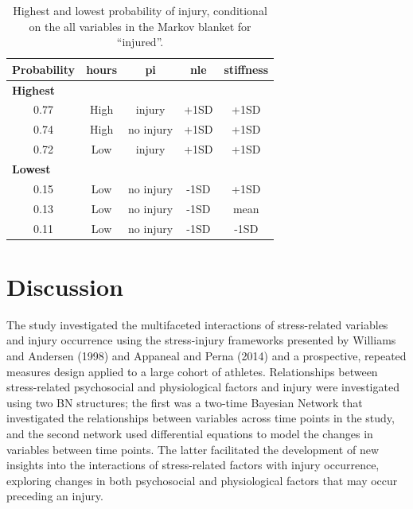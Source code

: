 \documentclass[
  english,
  man]{apa6}
\begin{document}
\begin{table}[H]

\caption{\label{tab:table10}Highest and lowest probability of injury, conditional on the all variables in the Markov blanket for ``injured''.}
\centering
\begin{tabular}[t]{c|c|c|c|c}
\hline
\textbf{Probability} & \textbf{hours} & \textbf{pi} & \textbf{nle} & \textbf{stiffness}\\
\hline
\multicolumn{5}{l}{\textbf{Highest}}\\
\hline
\hspace{1em}0.77 & High & injury & +1SD & +1SD\\
\hline
\hspace{1em}0.74 & High & no injury & +1SD & +1SD\\
\hline
\hspace{1em}0.72 & Low & injury & +1SD & +1SD\\
\hline
\multicolumn{5}{l}{\textbf{Lowest}}\\
\hline
\hspace{1em}0.15 & Low & no injury & -1SD & +1SD\\
\hline
\hspace{1em}0.13 & Low & no injury & -1SD & mean\\
\hline
\hspace{1em}0.11 & Low & no injury & -1SD & -1SD\\
\hline
\end{tabular}
\end{table}

\hypertarget{discussion}{%
\section{Discussion}\label{discussion}}

The study investigated the multifaceted interactions of stress-related variables and injury occurrence using the stress-injury frameworks presented by Williams and Andersen (1998) and Appaneal and Perna (2014) and a prospective, repeated measures design applied to a large cohort of athletes.
Relationships between stress-related psychosocial and physiological factors and injury were investigated using two BN structures; the first was a two-time Bayesian Network that investigated the relationships between variables across time points in the study, and the second network used differential equations to model the changes in variables between time points.
The latter facilitated the development of new insights into the interactions of stress-related factors with injury occurrence, exploring changes in both psychosocial and physiological factors that may occur preceding an injury.
\end{document}
